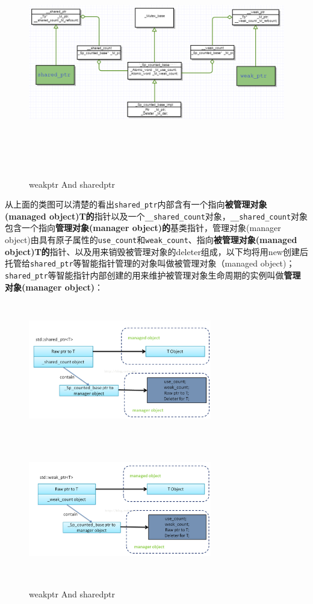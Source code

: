 \documentclass[UTF8,a4paper,12pt]{ctexbook}
\begin{document}
	\begin{figure}[H]
		\centering
		\includegraphics[width=17cm,height=10cm]{shared_ptr_count}
		\caption{weakptr And sharedptr}
	\end{figure}

	从上面的类图可以清楚的看出\verb|shared_ptr|内部含有一个指向\textbf{被管理对象(managed object)T的}指针以及一个\verb|__shared_count|对象，\verb|__shared_count|对象包含一个指向\textbf{管理对象(manager object)的}基类指针，管理对象(manager object)由具有原子属性的\verb|use_count|和\verb|weak_count|、指向\textbf{被管理对象(managed object)T的}指针、以及用来销毁被管理对象的deleter组成，以下均将用new创建后托管给\verb|shared_ptr|等智能指针管理的对象叫做被管理对象（managed object)；\verb|shared_ptr|等智能指针内部创建的用来维护被管理对象生命周期的实例叫做\textbf{管理对象(manager object)}：

	\begin{figure}[H]
		\centering
		\includegraphics[width=8cm,height=6cm]{shared_ptr}
		\includegraphics[width=8cm,height=6cm]{weak_ptr}
		\caption{weakptr And sharedptr}
	\end{figure}	
	
\end{document}
